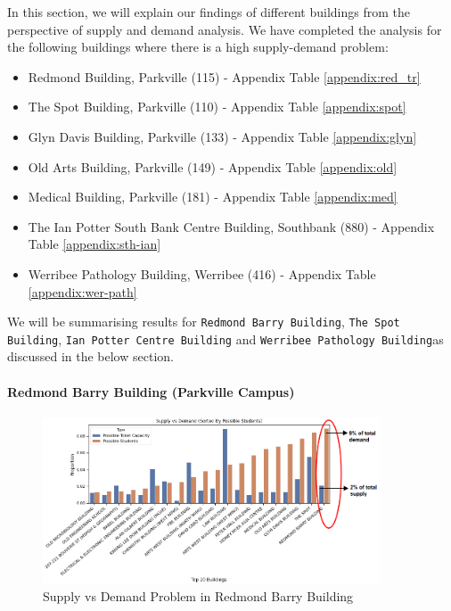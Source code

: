 In this section, we will explain our findings of different buildings from the perspective of supply and demand analysis. We have completed the analysis for the following buildings where there is a high supply-demand problem:
\begin{itemize}
    \item Redmond Building, Parkville (115) - Appendix Table \ref{appendix:red_tr}
    \item The Spot Building, Parkville (110) - Appendix Table \ref{appendix:spot}
    \item Glyn Davis Building, Parkville (133) - Appendix Table \ref{appendix:glyn}
    \item Old Arts Building, Parkville (149) - Appendix Table \ref{appendix:old}
    \item Medical Building, Parkville (181) - Appendix Table \ref{appendix:med}
    \item The Ian Potter South Bank Centre Building, Southbank  (880) - Appendix Table \ref{appendix:sth-ian}
    \item Werribee Pathology Building, Werribee (416) - Appendix Table \ref{appendix:wer-path}
\end{itemize}

We will be summarising results for \texttt{Redmond Barry Building}, \texttt{The Spot Building}, \texttt{Ian Potter Centre Building} and \texttt{Werribee Pathology Building}as discussed in the below section.


\paragraph{ Redmond Barry Building (Parkville Campus)}
\begin{figure}[H]
\centering
\includegraphics[width=10cm,keepaspectratio=true]{resources/images/spatial-tr/redmond2.PNG}
\caption{Supply vs Demand Problem in Redmond Barry Building}
\label{fig:eedmond_mr_s_vs_d}
\end{figure}

